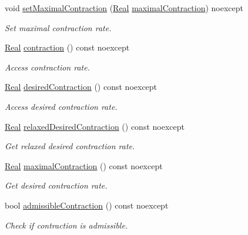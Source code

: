 \begin{DoxyCompactItemize}
void \hyperlink{classSpacy_1_1Mixin_1_1ContractionRate_acc99ba536cd9a027baa50a1412d9d216_acc99ba536cd9a027baa50a1412d9d216}{set\+Maximal\+Contraction} (\hyperlink{classSpacy_1_1Real}{Real} \hyperlink{classSpacy_1_1Mixin_1_1ContractionRate_adea1388b1e492db1392f67cbe7e89302_adea1388b1e492db1392f67cbe7e89302}{maximal\+Contraction}) noexcept
\begin{DoxyCompactList}\small\item\em Set maximal contraction rate. \end{DoxyCompactList}\item 
\hyperlink{classSpacy_1_1Real}{Real} \hyperlink{classSpacy_1_1Mixin_1_1ContractionRate_a6c5e653393be91e468364733702e5334_a6c5e653393be91e468364733702e5334}{contraction} () const noexcept
\begin{DoxyCompactList}\small\item\em Access contraction rate. \end{DoxyCompactList}\item 
\hyperlink{classSpacy_1_1Real}{Real} \hyperlink{classSpacy_1_1Mixin_1_1ContractionRate_aaefb97e44b51fb6c8017eb2b40659d64_aaefb97e44b51fb6c8017eb2b40659d64}{desired\+Contraction} () const noexcept
\begin{DoxyCompactList}\small\item\em Access desired contraction rate. \end{DoxyCompactList}\item 
\hyperlink{classSpacy_1_1Real}{Real} \hyperlink{classSpacy_1_1Mixin_1_1ContractionRate_a569e3e3766394ccc46a13bd6ca122394_a569e3e3766394ccc46a13bd6ca122394}{relaxed\+Desired\+Contraction} () const noexcept
\begin{DoxyCompactList}\small\item\em Get relaxed desired contraction rate. \end{DoxyCompactList}\item 
\hyperlink{classSpacy_1_1Real}{Real} \hyperlink{classSpacy_1_1Mixin_1_1ContractionRate_adea1388b1e492db1392f67cbe7e89302_adea1388b1e492db1392f67cbe7e89302}{maximal\+Contraction} () const noexcept
\begin{DoxyCompactList}\small\item\em Get desired contraction rate. \end{DoxyCompactList}\item 
bool \hyperlink{classSpacy_1_1Mixin_1_1ContractionRate_a7dd3c5eb5a7d14d8269207e3d1203aec_a7dd3c5eb5a7d14d8269207e3d1203aec}{admissible\+Contraction} () const noexcept
\begin{DoxyCompactList}\small\item\em Check if contraction is admissible. \end{DoxyCompactList}\item 

\end{DoxyCompactItemize}
